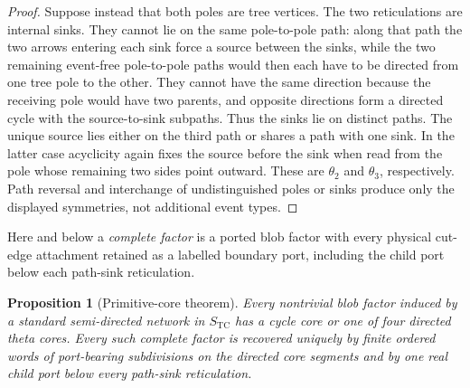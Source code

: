 \documentclass[11pt]{article}
\newtheorem{proposition}[theorem]{Proposition}
\theoremstyle{remark}
\newcommand{\TCs}{S_{\mathrm{TC}}}
\begin{document}
\begin{proof}
Suppose instead that both poles are tree vertices.  The two reticulations are
internal sinks.  They cannot lie on the same pole-to-pole path: along that
path the two arrows entering each sink force a source between the sinks, while
the two remaining event-free pole-to-pole paths would then each have to be
directed from one tree pole to the other.  They cannot have the same direction
because the receiving pole would have two parents, and opposite directions
form a directed cycle with the source-to-sink subpaths.  Thus the sinks lie
on distinct paths.  The unique source lies either on the third path or shares
a path with one sink.  In the latter case acyclicity again fixes the source
before the sink when read from the pole whose remaining two sides point
outward.  These are $\theta_2$ and $\theta_3$, respectively.  Path reversal
and interchange of undistinguished poles or sinks produce only the displayed
symmetries, not additional event types.
\end{proof}

Here and below a \emph{complete factor} is a ported blob factor with every
physical cut-edge attachment retained as a labelled boundary port, including
the child port below each path-sink reticulation.

\begin{proposition}[Primitive-core theorem]\label{prop:cores}
Every nontrivial blob factor induced by a standard semi-directed network in
$\TCs$ has a cycle core or one of four directed theta cores.  Every such
complete factor is recovered uniquely by finite ordered words of port-bearing
subdivisions on the directed core segments and by one real child port below
every path-sink reticulation.
\end{proposition}
\end{document}
